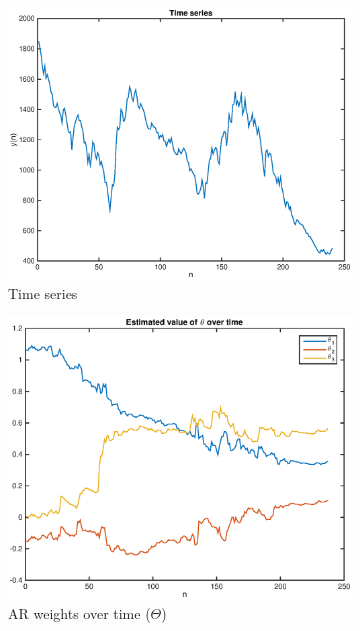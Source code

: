 \documentclass[12pt]{article}
\begin{document}
  \begin{figure}
    \centering
    \begin{subfigure}[b]{0.45\textwidth}
      \includegraphics[width=\textwidth]{figures/real_ts.eps}
      \caption{Time series}
      \label{fig:real_ts}
    \end{subfigure}
    \begin{subfigure}[b]{0.45\textwidth}
      \includegraphics[width=\textwidth]{figures/real_theta.eps}
      \caption{AR weights over time ($\Theta$)}
      \label{fig:real_theta}
    \end{subfigure}
    \begin{subfigure}[b]{0.45\textwidth}

\end{subfigure}
\end{figure}
\end{document}
